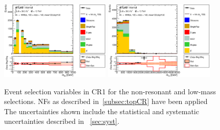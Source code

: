 \begin{figure}[!h]
\begin{center}
\includegraphics*[width=0.47\textwidth] {chapters/dihiggs2/figures/ControlPlots/36ifb_CPUpdated_opt700_mBBcr_plots_094/C_mBBcr_opt700ichep_mww_bbpt150_bbMass_regionA_met25d020}
\includegraphics*[width=0.47\textwidth] {chapters/dihiggs2/figures/ControlPlots/36ifb_CPUpdated_opt700_mBBcr_plots_094/C_mBBcr_opt700ichep_mww_bbpt150_hhMass_regionA_met25d020}
\caption[Event selection variables in CR1 for the non-resonant and low-mass selections.]{Event selection variables in CR1 for the non-resonant and low-mass selections. \ttbar NFs as described in~\ref{subsec:topCR} have been applied The uncertainties shown include the statistical and systematic uncertainties described in ~\ref{sec:syst}.}
\label{fig:cr1_var}
\end{center}
\end{figure}


